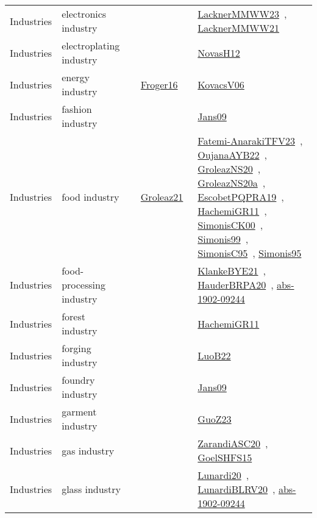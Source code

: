 {\begin{longtable}{lp{3cm}>{\raggedright\arraybackslash}p{6cm}>{\raggedright\arraybackslash}p{6cm}>{\raggedright\arraybackslash}p{8cm}}
Industries & electronics industry &  &  & \href{../works/LacknerMMWW23.pdf}{LacknerMMWW23}~\cite{LacknerMMWW23}, \href{../works/LacknerMMWW21.pdf}{LacknerMMWW21}~\cite{LacknerMMWW21}\\
Industries & electroplating industry &  &  & \href{../works/NovasH12.pdf}{NovasH12}~\cite{NovasH12}\\
Industries & energy industry &  & \href{../works/Froger16.pdf}{Froger16}~\cite{Froger16} & \href{../works/KovacsV06.pdf}{KovacsV06}~\cite{KovacsV06}\\
Industries & fashion industry &  &  & \href{../works/Jans09.pdf}{Jans09}~\cite{Jans09}\\
Industries & food industry &  & \href{../works/Groleaz21.pdf}{Groleaz21}~\cite{Groleaz21} & \href{../works/Fatemi-AnarakiTFV23.pdf}{Fatemi-AnarakiTFV23}~\cite{Fatemi-AnarakiTFV23}, \href{../works/OujanaAYB22.pdf}{OujanaAYB22}~\cite{OujanaAYB22}, \href{../works/GroleazNS20.pdf}{GroleazNS20}~\cite{GroleazNS20}, \href{../works/GroleazNS20a.pdf}{GroleazNS20a}~\cite{GroleazNS20a}, \href{../works/EscobetPQPRA19.pdf}{EscobetPQPRA19}~\cite{EscobetPQPRA19}, \href{../works/HachemiGR11.pdf}{HachemiGR11}~\cite{HachemiGR11}, \href{../works/SimonisCK00.pdf}{SimonisCK00}~\cite{SimonisCK00}, \href{../works/Simonis99.pdf}{Simonis99}~\cite{Simonis99}, \href{../works/SimonisC95.pdf}{SimonisC95}~\cite{SimonisC95}, \href{../works/Simonis95.pdf}{Simonis95}~\cite{Simonis95}\\
Industries & food-processing industry &  &  & \href{../works/KlankeBYE21.pdf}{KlankeBYE21}~\cite{KlankeBYE21}, \href{../works/HauderBRPA20.pdf}{HauderBRPA20}~\cite{HauderBRPA20}, \href{../works/abs-1902-09244.pdf}{abs-1902-09244}~\cite{abs-1902-09244}\\
Industries & forest industry &  &  & \href{../works/HachemiGR11.pdf}{HachemiGR11}~\cite{HachemiGR11}\\
Industries & forging industry &  &  & \href{../works/LuoB22.pdf}{LuoB22}~\cite{LuoB22}\\
Industries & foundry industry &  &  & \href{../works/Jans09.pdf}{Jans09}~\cite{Jans09}\\
Industries & garment industry &  &  & \href{../works/GuoZ23.pdf}{GuoZ23}~\cite{GuoZ23}\\
Industries & gas industry &  &  & \href{../works/ZarandiASC20.pdf}{ZarandiASC20}~\cite{ZarandiASC20}, \href{../works/GoelSHFS15.pdf}{GoelSHFS15}~\cite{GoelSHFS15}\\
Industries & glass industry &  &  & \href{../works/Lunardi20.pdf}{Lunardi20}~\cite{Lunardi20}, \href{../works/LunardiBLRV20.pdf}{LunardiBLRV20}~\cite{LunardiBLRV20}, \href{../works/abs-1902-09244.pdf}{abs-1902-09244}~\cite{abs-1902-09244}\\

\end{longtable}}

